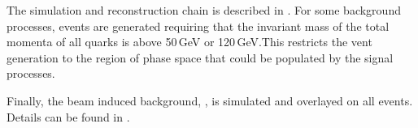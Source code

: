 
The simulation and reconstruction chain is described in . For some background processes, events are generated requiring that the invariant mass of the total momenta of all quarks is above 50\,GeV or 120\,GeV.This restricts the vent generation to the region of phase space that could be populated by the signal processes.




Finally, the beam induced background, \ggHad, is simulated and overlayed on all events. Details can be found in .

